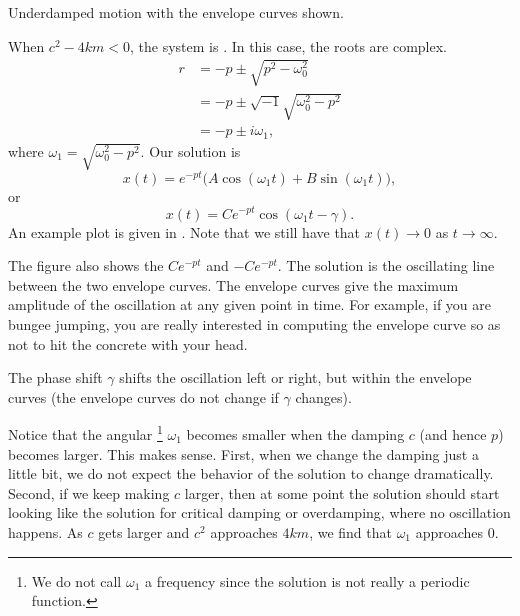 \begin{mywrapfig}[13]{3.25in}
\capstart
{}
\caption{Underdamped motion with the envelope curves shown.\label{mv:underdampedfig}}
\end{mywrapfig}
%
%
When
$c^2 - 4km < 0$, the system is \emph{}.  In this case,
the roots are complex.
\begin{equation*}
\begin{split}
r & =
-p \pm \sqrt{p^2 - \omega_0^2} \\
& = 
-p \pm \sqrt{-1}\sqrt{\omega_0^2 - p^2} \\
& = 
-p \pm i \omega_1 ,
\end{split}
\end{equation*}
where $\omega_1 =\sqrt{\omega_0^2 - p^2}$.  Our solution is
\begin{equation*}
x(t) = e^{-pt} \bigl( A \cos (\omega_1 t) + B \sin (\omega_1 t) \bigr) ,
\end{equation*}
or
\begin{equation*}
x(t) = C e^{-pt} \cos ( \omega_1 t - \gamma ) .
\end{equation*}
An example plot is given in .  Note that we
still have that $x(t) \to 0$ as $t \to \infty$.


The figure also 
shows the \emph{}
$C e^{-pt}$ and $-C e^{-pt}$.  The solution
is the oscillating line between the two envelope curves.
The envelope curves give
the maximum amplitude of the oscillation at any given point in time.  For
example, if you are bungee jumping, you are really interested in computing the
envelope curve so as not to hit the concrete with your head.

The phase shift $\gamma$ shifts the oscillation left or right, but within the
envelope curves (the envelope curves do not change if $\gamma$
changes).


Notice that the angular
\emph{}\footnote{We do not call $\omega_1$ a frequency
since the solution is not really a periodic function.} $\omega_1$ becomes
smaller when the damping $c$ (and hence $p$) becomes larger.
This makes sense.
First, when we change the damping just a little bit, we do not
expect the behavior of the solution to change dramatically.
Second, if we keep making $c$ larger, then
at some point the solution should start looking 
like the solution for critical damping or overdamping, where no oscillation
happens.
As $c$ gets larger and $c^2$ approaches $4km$,
we find that $\omega_1$ approaches $0$.


